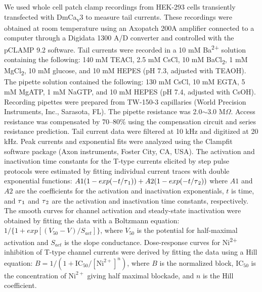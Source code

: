 We used whole cell patch clamp recordings from HEK-293 cells transiently transfected with DmCa\textsubscript{v}3 to measure tail currents. 
These recordings were obtained at room temperature using an Axopatch 200A amplifier connected to a computer through a Digidata 1300 A/D converter and controlled with the pCLAMP 9.2 software.
Tail currents were recorded in a 10 mM Ba\textsuperscript{2+} solution containing the following: 140 mM TEACl, 2.5 mM CsCl, 10 mM BaCl\textsubscript{2}, 1 mM MgCl\textsubscript{2}, 10 mM glucose, and 10 mM HEPES (pH 7.3, adjusted with TEAOH).
The pipette solution contained the following: 130 mM CsCl, 10 mM EGTA, 5 mM MgATP, 1 mM NaGTP, and 10 mM HEPES (pH 7.4, adjusted with CsOH). 
Recording pipettes were prepared from TW-150-3 capillaries (World Precision Instruments, Inc., Sarasota, FL).
The pipette resistance was 2.0$\sim$3.0 M$\Omega$.
Access resistance was compensated by 70--80\% using the compensation circuit and series resistance prediction.
Tail current data were filtered at 10 kHz and digitized at 20 kHz.
Peak currents and exponential fits were analyzed using the Clampfit software package (Axon instruments, Foster City, CA, USA).
The activation and inactivation time constants for the T-type currents elicited by step pulse protocols were estimated by fitting individual current traces with double exponential functions: $A1(1-exp(-t/\tau\textsubscript{1})) + A2(1-exp(-t/\tau\textsubscript{2}))$ where $A1$ and $A2$ are the coefficients for the activation and inactivation exponentials, $t$ is time, and $\tau\textsubscript{1}$ and $\tau\textsubscript{2}$ are the activation and inactivation time constants, respectively.
The smooth curves for channel activation and steady-state inactivation were obtained by fitting the data with a Boltzmann equation: $1/\{1+exp[(V_{50}-V)/S_{act}]\}$, where $V_{50}$ is the potential for half-maximal activation and $S_{act}$ is the slope conductance.
Dose-response curves for Ni\textsuperscript{2+} inhibition of T-type channel currents were derived by fitting the data using a Hill equation: $B = 1/(1 + \textrm{IC}_{50}/[\textrm{Ni}^{2+}]^n)$, where $B$ is the normalized block, $\textrm{IC}_{50}$ is the concentration of $\textrm{Ni}^{2+}$ giving half maximal blockade, and $n$ is the Hill coefficient.
